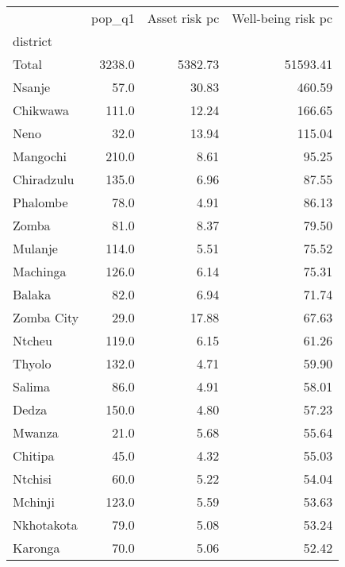 \begin{tabular}{lrrr}
\toprule
{} &  pop\_q1 &  Asset risk pc &  Well-being risk pc \\
district      &         &                &                     \\
\midrule
Total         &  3238.0 &        5382.73 &            51593.41 \\
Nsanje        &    57.0 &          30.83 &              460.59 \\
Chikwawa      &   111.0 &          12.24 &              166.65 \\
Neno          &    32.0 &          13.94 &              115.04 \\
Mangochi      &   210.0 &           8.61 &               95.25 \\
Chiradzulu    &   135.0 &           6.96 &               87.55 \\
Phalombe      &    78.0 &           4.91 &               86.13 \\
Zomba         &    81.0 &           8.37 &               79.50 \\
Mulanje       &   114.0 &           5.51 &               75.52 \\
Machinga      &   126.0 &           6.14 &               75.31 \\
Balaka        &    82.0 &           6.94 &               71.74 \\
Zomba City    &    29.0 &          17.88 &               67.63 \\
Ntcheu        &   119.0 &           6.15 &               61.26 \\
Thyolo        &   132.0 &           4.71 &               59.90 \\
Salima        &    86.0 &           4.91 &               58.01 \\
Dedza         &   150.0 &           4.80 &               57.23 \\
Mwanza        &    21.0 &           5.68 &               55.64 \\
Chitipa       &    45.0 &           4.32 &               55.03 \\
Ntchisi       &    60.0 &           5.22 &               54.04 \\
Mchinji       &   123.0 &           5.59 &               53.63 \\
Nkhotakota    &    79.0 &           5.08 &               53.24 \\
Karonga       &    70.0 &           5.06 &               52.42 \\

\end{tabular}
